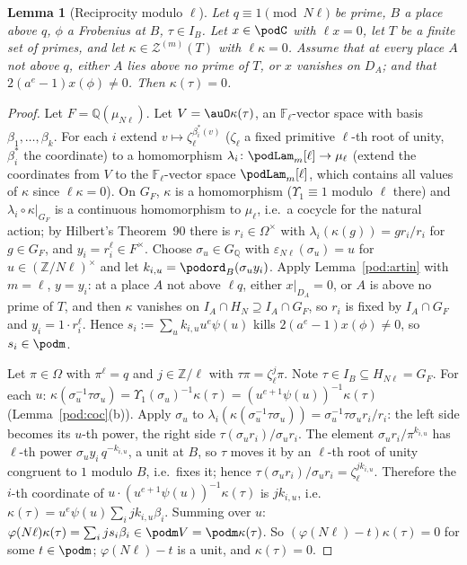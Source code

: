 \documentclass[10pt]{amsart}
\newtheorem{lemma}[theorem]{Lemma}
\theoremstyle{definition}
\theoremstyle{remark}
\newcommand{\Z}{\mathbb Z}
\newcommand{\Q}{\mathbb Q}
\begin{document}
\begin{lemma}[Reciprocity modulo $\ell$]\label{pod:recl}
Let $q\equiv1\pmod{N\ell}$ be prime, $B$ a place above $q$, $\phi$ a Frobenius at $B$, $\tau\in I_B$.
Let $x\in\podC$ with $\ell x=0$, let $T$ be a finite set of primes, and let $\kappa\in\mathcal
Z^{(m)}(T)$ with $\ell\kappa=0$. Assume that at every place $A$ not above $q$, either $A$ lies above
no prime of $T$, or $x$ vanishes on $D_A$; and that $2(a^e-1)x(\phi)\ne0$. Then $\kappa(\tau)=0$.
\end{lemma}
\begin{proof}
Let $F=\Q(\mu_{N\ell})$. Let $V=\auO\kappa(\tau)$, an $\mathbb F_\ell$-vector space with basis
$\beta_1,\dots,\beta_k$. For each $i$ extend $v\mapsto\zeta_\ell^{\beta_i^*(v)}$ ($\zeta_\ell$ a fixed
primitive $\ell$-th root of unity, $\beta_i^*$ the coordinate) to a homomorphism $\lambda_i\colon\podLam_m[\ell]\to\mu_\ell$
(extend the coordinates from $V$ to the $\mathbb F_\ell$-vector space $\podLam_m[\ell]$, which contains
all values of $\kappa$ since $\ell\kappa=0$). On $G_F$, $\kappa$ is a homomorphism ($\Upsilon_1\equiv1$ modulo $\ell$
there) and $\lambda_i\circ\kappa|_{G_F}$ is a continuous homomorphism to $\mu_\ell$, i.e.\ a cocycle for
the natural action; by Hilbert's Theorem~90 there is $r_i\in\Omega^\times$ with
$\lambda_i(\kappa(g))=gr_i/r_i$ for $g\in G_F$, and $y_i=r_i^\ell\in F^\times$. Choose $\sigma_u\in
G_\Q$ with $\varepsilon_{N\ell}(\sigma_u)=u$ for $u\in(\Z/N\ell)^\times$ and let $k_{i,u}=
\podord_B(\sigma_uy_i)$. Apply Lemma~\ref{pod:artin} with $m=\ell$, $y=y_i$: at a place $A$ not above
$\ell q$, either $x|_{D_A}=0$, or $A$ is above no prime of $T$, and then $\kappa$ vanishes on
$I_A\cap H_N\supseteq I_A\cap G_F$, so $r_i$ is fixed by $I_A\cap G_F$ and $y_i=1\cdot r_i^\ell$.
Hence $s_i:=\sum_uk_{i,u}u^e\psi(u)$ kills $2(a^e-1)x(\phi)\ne0$, so $s_i\in\podm$.

Let $\pi\in\Omega$ with $\pi^\ell=q$ and $j\in\Z/\ell$ with $\tau\pi=\zeta_\ell^j\pi$. Note $\tau\in
I_B\subseteq H_{N\ell}=G_F$. For each $u$: $\kappa(\sigma_u^{-1}\tau\sigma_u)=\Upsilon_1(\sigma_u)^{-1}
\kappa(\tau)=(u^{e+1}\psi(u))^{-1}\kappa(\tau)$ (Lemma~\ref{pod:coc}(b)). Apply $\sigma_u$ to
$\lambda_i(\kappa(\sigma_u^{-1}\tau\sigma_u))=\sigma_u^{-1}\tau\sigma_u r_i/r_i$: the left side becomes
its $u$-th power, the right side $\tau(\sigma_ur_i)/\sigma_ur_i$. The element $\sigma_ur_i/\pi^{k_{i,u}}$
has $\ell$-th power $\sigma_uy_i\,q^{-k_{i,u}}$, a unit at $B$, so $\tau$ moves it by an $\ell$-th root
of unity congruent to $1$ modulo $B$, i.e.\ fixes it; hence $\tau(\sigma_ur_i)/\sigma_ur_i=
\zeta_\ell^{jk_{i,u}}$. Therefore the $i$-th coordinate of $u\cdot(u^{e+1}\psi(u))^{-1}\kappa(\tau)$ is
$jk_{i,u}$, i.e.\ $\kappa(\tau)=u^e\psi(u)\sum_ijk_{i,u}\beta_i$. Summing over $u$:
$\varphi(N\ell)\kappa(\tau)=\sum_ijs_i\beta_i\in\podm V=\podm\kappa(\tau)$. So $(\varphi(N\ell)-t)
\kappa(\tau)=0$ for some $t\in\podm$; $\varphi(N\ell)-t$ is a unit, and $\kappa(\tau)=0$.
\end{proof}
\end{document}
